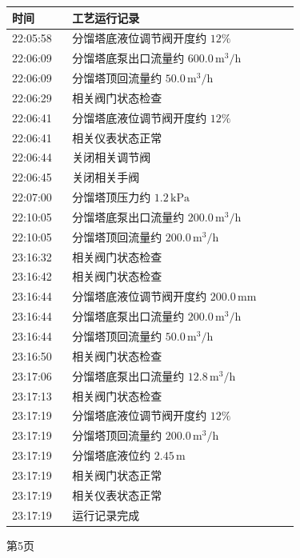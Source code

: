 \documentclass[UTF8,10pt,a4paper,fontset=fandol]{ctexart}
\begin{document}
\begin{center}
\small
\begin{tabular}{|p{0.18\linewidth}|p{0.68\linewidth}|}
\hline
时间 & 工艺运行记录 \\ \hline
22:05:58 & 分馏塔底液位调节阀开度约 $12\%$ \\ \hline
22:06:09 & 分馏塔底泵出口流量约 $600.0\,\mathrm{m^3/h}$ \\ \hline
22:06:09 & 分馏塔顶回流量约 $50.0\,\mathrm{m^3/h}$ \\ \hline
22:06:29 & 相关阀门状态检查 \\ \hline
22:06:41 & 分馏塔底液位调节阀开度约 $12\%$ \\ \hline
22:06:41 & 相关仪表状态正常 \\ \hline
22:06:44 & 关闭相关调节阀 \\ \hline
22:06:45 & 关闭相关手阀 \\ \hline
22:07:00 & 分馏塔顶压力约 $1.2\,\mathrm{kPa}$ \\ \hline
22:10:05 & 分馏塔底泵出口流量约 $200.0\,\mathrm{m^3/h}$ \\ \hline
22:10:05 & 分馏塔顶回流量约 $200.0\,\mathrm{m^3/h}$ \\ \hline
23:16:32 & 相关阀门状态检查 \\ \hline
23:16:42 & 相关阀门状态检查 \\ \hline
23:16:44 & 分馏塔底液位调节阀开度约 $200.0\,\mathrm{mm}$ \\ \hline
23:16:44 & 分馏塔底泵出口流量约 $200.0\,\mathrm{m^3/h}$ \\ \hline
23:16:44 & 分馏塔顶回流量约 $50.0\,\mathrm{m^3/h}$ \\ \hline
23:16:50 & 相关阀门状态检查 \\ \hline
23:17:06 & 分馏塔底泵出口流量约 $12.8\,\mathrm{m^3/h}$ \\ \hline
23:17:13 & 相关阀门状态检查 \\ \hline
23:17:19 & 分馏塔底液位调节阀开度约 $12\%$ \\ \hline
23:17:19 & 分馏塔顶回流量约 $200.0\,\mathrm{m^3/h}$ \\ \hline
23:17:19 & 分馏塔底液位约 $2.45\,\mathrm{m}$ \\ \hline
23:17:19 & 相关阀门状态正常 \\ \hline
23:17:19 & 相关仪表状态正常 \\ \hline
23:17:19 & 运行记录完成 \\ \hline
\end{tabular}

\vspace{1em}
第5页
\end{center}
\end{document}
